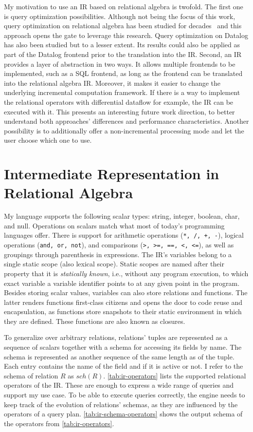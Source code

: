 My motivation to use an \ac{IR} based on relational algebra is twofold.
The first one is query optimization possibilities.
Although not being the focus of this work, query optimization on relational
algebra has been studied for decades~\cite{selinger1979access} and this approach
opens the gate to leverage this research.
Query optimization on Datalog has also been studied but to a lesser extent.
Its results could also be applied as part of the Datalog frontend prior to the
translation into the \ac{IR}.
Second, an \ac{IR} provides a layer of abstraction in two ways.
It allows multiple frontends to be implemented, such as a SQL frontend,
as long as the frontend can be translated into the relational algebra \ac{IR}.
Moreover, it makes it easier to change the underlying incremental computation
framework.
If there is a way to implement the relational operators with differential
dataflow for example, the \ac{IR} can be executed with it.
This presents an interesting future work direction, to better understand
both approaches' differences and performance characteristics.
Another possibility is to additionally offer a non-incremental processing mode
and let the user choose which one to use.

\section{Intermediate Representation in Relational Algebra}\label{sec:ir}

My language supports the following scalar types: string, integer, boolean, char,
and null.
Operations on scalars match what most of today's programming languages offer.
There is support for arithmetic operations (\texttt{*, /, +, -}),
logical operations (\texttt{and, or, not}),
and comparisons (\texttt{>, >=, ==, <, <=}),
as well as groupings through parenthesis in expressions.
The \ac{IR}'s variables belong to a single static scope (also lexical scope).
Static scopes are named after their property that it is \emph{statically known},
i.e., without any program execution, to which exact variable a
variable identifier points to at any given point in the program.
Besides storing scalar values, variables can also store relations and functions.
The latter renders functions first-class citizens and opens the door to
code reuse and encapsulation, as functions store snapshots to their static
environment in which they are defined.
These functions are also known as closures.

To generalize over arbitrary relations, relations' tuples are represented as
a sequence of scalars together with a schema for accessing its fields by name.
The schema is represented as another sequence of the same length as of the tuple.
Each entry contains the name of the field and if it is active or not.
I refer to the schema of relation \(R\) as \(\mathit{sch}(R)\).
\ref{tab:ir-operators} lists the supported relational operators of the \ac{IR}.
These are enough to express a wide range of queries and support my use case.
To be able to execute queries correctly, the engine needs to keep track of
the evolution of relations' schemas, as they are influenced by the operators
of a query plan.
\ref{tab:ir-schema-operators} shows the output schema of the operators from
\ref{tab:ir-operators}.

